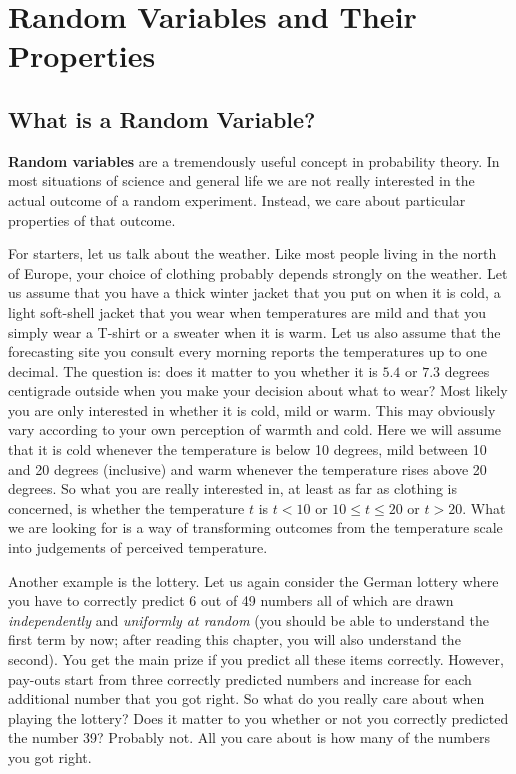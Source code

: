 \graphicspath{{../chapter3/}}
\chapter{Random Variables and Their Properties}

\section{What is a Random Variable?}
\textbf{Random variables} are a tremendously useful concept in probability theory. In most situations of
science and general life we are not really interested in the actual outcome of a random experiment. Instead,
we care about particular properties of that outcome.

For starters, let us talk about the weather. 
Like most people living in the north of Europe, your choice of clothing
probably depends strongly on the weather. Let us assume that you have a thick winter jacket that you
put on when it is cold, a light soft-shell jacket that you wear when temperatures are mild and that you
simply wear a T-shirt or a sweater when it is warm. Let us also assume that the forecasting site you
consult every morning reports the temperatures up to one decimal. The question is: does it matter to you
whether it is $ 5.4 $ or $ 7.3 $ degrees centigrade outside when you make your decision about what to wear?
Most likely you are only interested in whether it is cold, mild or warm. This may obviously vary according
to your own perception of warmth and cold. Here we will assume that it is cold whenever the temperature
is below 10 degrees, mild between 10 and 20 degrees (inclusive) and warm whenever the temperature rises
above 20 degrees. So what you are really interested in, at least as far as clothing is concerned, is 
whether the temperature $ t $ is $ t < 10 $ or $ 10 \leq t \leq 20 $ or $ t > 20 $. What we are looking for
is a way of transforming outcomes from the temperature scale into judgements of perceived temperature.

Another example is the lottery. Let us again consider the German lottery where you have to correctly 
predict 6 out of 49 numbers all of which are drawn \textit{independently} 
and \textit{uniformly at random} (you should be able to understand the first term by now; after reading
this chapter, you will also understand the second). You get the main prize if you predict all these items
correctly. However, pay-outs start from three correctly predicted numbers and increase for each additional
number that you got right. So what do you really care about when playing the lottery? Does it matter to
you whether or not you correctly predicted the number 39? Probably not. All you care about is how many of
the numbers you got right.

